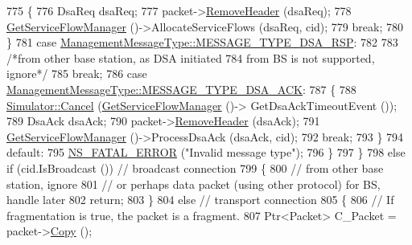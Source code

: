 \begin{DoxyCode}
775               \{
776                 DsaReq dsaReq;
777                 packet->\hyperlink{classns3_1_1Packet_a0961eccf975d75f902d40956c93ba63e}{RemoveHeader} (dsaReq);
778                 \hyperlink{classns3_1_1BaseStationNetDevice_a16a12a1027391156e044a28534c0eaf2}{GetServiceFlowManager} ()->AllocateServiceFlows (dsaReq, cid);
779                 \textcolor{keywordflow}{break};
780               \}
781             \textcolor{keywordflow}{case} \hyperlink{classns3_1_1ManagementMessageType_a0e0c7a1e263538f0379d1bdb015abe3dafcc36bf51cd0bf98daaa56183458c2af}{ManagementMessageType::MESSAGE\_TYPE\_DSA\_RSP}:
782 
783               \textcolor{comment}{/*from other base station, as DSA initiated}
784 \textcolor{comment}{               from BS is not supported, ignore*/}
785               \textcolor{keywordflow}{break};
786             \textcolor{keywordflow}{case} \hyperlink{classns3_1_1ManagementMessageType_a0e0c7a1e263538f0379d1bdb015abe3dae1871841d7226eddeea335c608f68357}{ManagementMessageType::MESSAGE\_TYPE\_DSA\_ACK}:
787               \{
788                 \hyperlink{classns3_1_1Simulator_a1b903a62d6117ef28f7ba3c6500689bf}{Simulator::Cancel} (\hyperlink{classns3_1_1BaseStationNetDevice_a16a12a1027391156e044a28534c0eaf2}{GetServiceFlowManager} ()->
      GetDsaAckTimeoutEvent ());
789                 DsaAck dsaAck;
790                 packet->\hyperlink{classns3_1_1Packet_a0961eccf975d75f902d40956c93ba63e}{RemoveHeader} (dsaAck);
791                 \hyperlink{classns3_1_1BaseStationNetDevice_a16a12a1027391156e044a28534c0eaf2}{GetServiceFlowManager} ()->ProcessDsaAck (dsaAck, cid);
792                 \textcolor{keywordflow}{break};
793               \}
794             \textcolor{keywordflow}{default}:
795               \hyperlink{group__fatal_ga5131d5e3f75d7d4cbfd706ac456fdc85}{NS\_FATAL\_ERROR} (\textcolor{stringliteral}{"Invalid message type"});
796             \}
797         \}
798       \textcolor{keywordflow}{else} \textcolor{keywordflow}{if} (cid.IsBroadcast ()) \textcolor{comment}{// broadcast connection}
799         \{
800           \textcolor{comment}{// from other base station, ignore}
801           \textcolor{comment}{// or perhaps data packet (using other protocol) for BS, handle later}
802           \textcolor{keywordflow}{return};
803         \}
804       \textcolor{keywordflow}{else} \textcolor{comment}{// transport connection}
805         \{
806           \textcolor{comment}{// If fragmentation is true, the packet is a fragment.}
807           Ptr<Packet> C\_Packet = packet->\hyperlink{classns3_1_1Packet_a5d5c70802a5f77fc5f0001e0cfc1898b}{Copy} ();

\end{DoxyCode}
